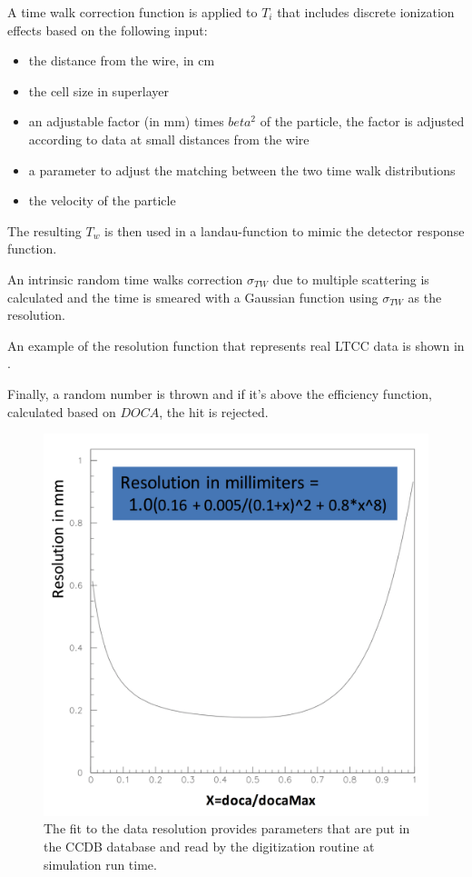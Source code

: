 A time walk correction function is applied to $T_i$ that includes discrete ionization effects based on the following input:

\begin{itemize}
	\item the distance from the wire, in cm
	\item the cell size in superlayer
	\item an adjustable factor (in mm) times $beta^2$ of the particle, the factor is adjusted according to data at small distances from the wire
	\item a parameter to adjust the matching between the two time walk distributions
	\item the velocity of the particle
\end{itemize}

The resulting $T_w$ is then used in a landau-function to mimic the detector response function.

An intrinsic random time walks correction $\sigma_{TW}$ due to multiple scattering is calculated and the time is smeared with
a Gaussian function using $\sigma_{TW}$ as the resolution.

An example of the resolution function that represents real LTCC data is shown in .

Finally, a random number is thrown and if it's above the efficiency function, calculated based on $DOCA$, the hit is rejected.

\begin{figure}
	\centering
	\includegraphics[width=0.95\columnwidth,keepaspectratio]{img/dcResolution.png}
	\caption{The fit to the data resolution provides parameters that are put in the CCDB database and read by the digitization routine at simulation run time.}
	\label{fig:dcResolution}
\end{figure}


